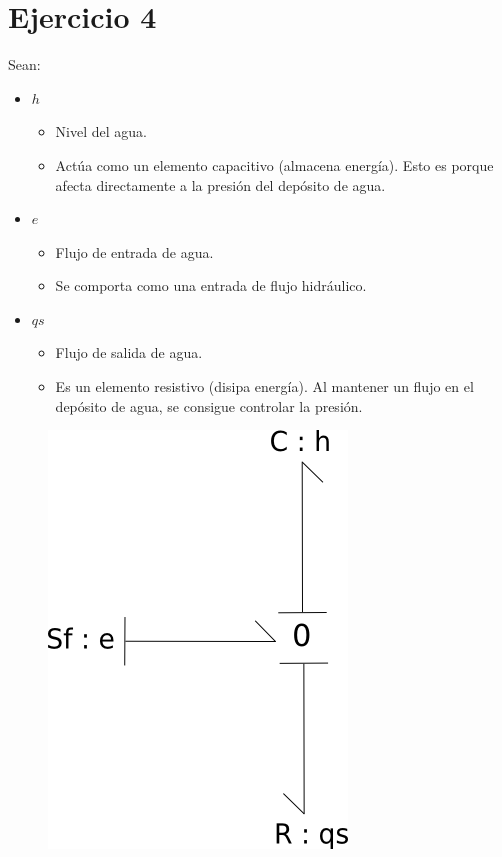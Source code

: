 \documentclass[12pt]{article}
\begin{document}
\section{Ejercicio 4}
Sean:
\begin{itemize}
    \item $h$
        \begin{itemize}
            \item Nivel del agua.
            \item Actúa como un elemento capacitivo (almacena energía). Esto es porque afecta
                  directamente a la presión del depósito de agua.
        \end{itemize}
    \item $e$
        \begin{itemize}
            \item Flujo de entrada de agua.
            \item Se comporta como una entrada de flujo hidráulico.
        \end{itemize}
    \item $qs$
        \begin{itemize}
            \item Flujo de salida de agua.
            \item Es un elemento resistivo (disipa energía). Al mantener un flujo en el depósito de
                  agua, se consigue controlar la presión.
        \end{itemize}
\end{itemize}
\begin{figure}[H]
    \center
    \includegraphics[scale=0.35]{tanque.png}
\end{figure}
\newpage
\end{document}
